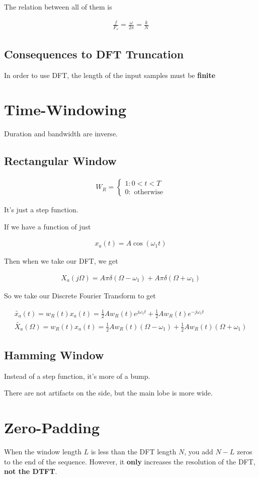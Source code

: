 \documentclass[fleqn]{report}
\newcommand{\equations} [1] {
\begin{gather*}
#1
\end{gather*}
}
\begin{document}
The relation between all of them is 
\equations{
    \frac{f}{F_s}
    =
    \frac{\omega}{2 \pi}
    =
    \frac{k}{N}
}

\subsection{Consequences to DFT Truncation}
In order to use DFT, the length of the input samples must be \textbf{finite}

\section{Time-Windowing}
Duration and bandwidth are inverse. 

\subsection{Rectangular Window}
\equations{
    W_R =
    \begin{cases}
        1: 
        0 < t < T 
        \\
        0:
        \textrm{ otherwise} 
    \end{cases}
}
It's just a step function.

If we have a function of just 
\equations{
    x_a(t)
    =
    A \cos(\omega_1 t)
}

Then when we take our DFT, we get 
\equations{
    X_a(j \Omega)
    =
    A \pi \delta(\Omega - \omega_1)
    +
    A \pi \delta(\Omega + \omega_1)
}

So we take our Discrete Fourier Transform to get 
\equations{
    \tilde{x_a}(t) 
    =
    w_R (t) x_a(t) 
    =
    \frac{1}{2}
    A w_R(t) e^{j \omega_1 t}
    +
    \frac{1}{2}
    A w_R(t) e^{-j \omega_1 t}
    \\
    \tilde{X_a}(\Omega) 
    =
    w_R (t) x_a(t) 
    =
    \frac{1}{2}
    A w_R(t) (\Omega - \omega_1)
    +
    \frac{1}{2}
    A w_R(t) (\Omega + \omega_1)
}


\subsection{Hamming Window}
Instead of a step function, it's more of a bump. 

There are not artifacts on the side, but the main lobe is more wide. 

\section{Zero-Padding}
When the window length $L$ is less than the DFT length $N$, you 
add $N - L$ zeros to the end of the sequence. However, it \textbf{only}
increases the resolution of the DFT, \textbf{not the DTFT}.
\end{document}
